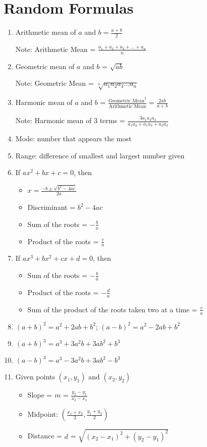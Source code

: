 \documentclass[../uilmath.tex]{subfiles}
\begin{document}
\section*{Random Formulas}
\begin{enumerate}
    \item Arithmetic mean of $a$ and $b = \frac{a+b}{2}$
    
    Note: Arithmetic Mean = $\frac{a_1+a_2+a_3+\dots + a_n}{n}$

    \item Geometric mean of $a$ and $b$ = $\sqrt{ab}$
    
    Note: Geometric Mean = $\sqrt[n]{a_1a_2a_3\dots a_n}$

    \item Harmonic mean of $a$ and $b$ = $\frac{\text{Geometric Mean}^2}{\text{Arithmetic Mean}}=\frac{2ab}{a+b}$
    
    Note: Harmonic mean of 3 terms = $\frac{3a_1a_2a_3}{a_1a_2+a_1a_3+a_2a_3}$

    \item Mode: number that appears the most 
    \item Range: difference of smallest and largest number given 
    \item If $ax^2+bx+c=0$, then 
    \begin{itemize}
        \item $x=\frac{-b\pm \sqrt{b^2-4ac}}{2a}$
        \item Discriminant = $b^2-4ac$
        \item Sum of the roots = $-\frac{b}{a}$
        \item Product of the roots = $\frac{c}{a}$
    \end{itemize}

    \item If $ax^3+bx^2+cx+d=0$, then 
    \begin{itemize}
        \item Sum of the roots = $-\frac{b}{a}$
        \item Product of the roots = $-\frac{d}{a}$
        \item Sum of the product of the roots taken two at a time = $\frac{c}{a}$
    \end{itemize}

    \item $(a+b)^2 = a^2+2ab+b^2$; $(a-b)^2=a^2-2ab+b^2$
    \item $(a+b)^3=a^3+3a^2b+3ab^2+b^3$
    \item $(a-b)^3=a^3-3a^2b+3ab^2-b^3$
    \item Given points $(x_1,y_1)$ and $(x_2,y_2)$
    \begin{itemize}
        \item Slope = $m$ = $\frac{y_2-y_1}{x_2-x_1}$
        \item Midpoint: $\left(\frac{x_1+x_2}{2}, \frac{y_1+y_2}{2}\right)$
        \item Distance = $d$ = $\sqrt{(x_2-x_1)^2+(y_2-y_1)^2}$
    \end{itemize}


\end{enumerate}
\end{document}
